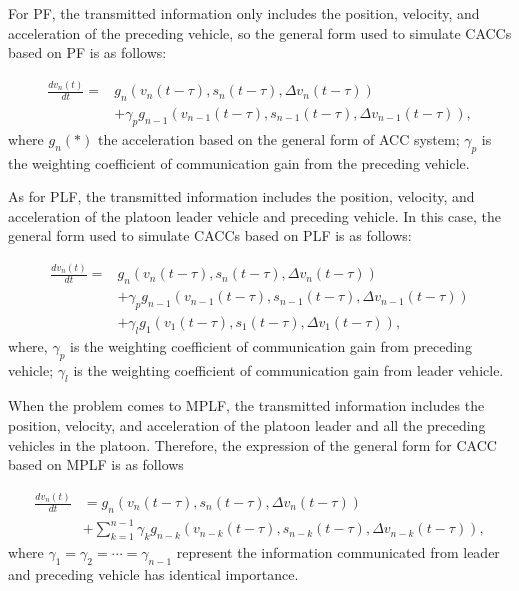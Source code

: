 \documentclass[journal]{IEEEtran}
\begin{document}
For PF, the transmitted information only includes the position, velocity, and acceleration of the preceding vehicle, so the general form used to simulate CACCs based on PF is as follows:

\begin{equation}
\begin{aligned}
\frac{d v_{n}(t)}{d t}=& g_{n}\left(v_{n}(t-\tau), s_{n}(t-\tau), \Delta v_{n}(t-\tau)\right) \\
&+\gamma_{p} g_{n-1}\left(v_{n-1}(t-\tau), s_{n-1}(t-\tau), \Delta v_{n-1}(t-\tau)\right),
\end{aligned}
\label{Eq2}
\end{equation}
where $g_n (*)$ the acceleration based on the general form of ACC system; $\gamma_p$ is the weighting coefficient of communication gain from the preceding vehicle.


As for PLF, the transmitted information includes the position, velocity, and acceleration of the platoon leader vehicle and preceding vehicle. In this case, the general form used to simulate CACCs based on PLF is as follows:

\begin{equation}
\begin{aligned}
\frac{d v_{n}(t)}{d t}=& g_{n}\left(v_{n}(t-\tau), s_{n}(t-\tau), \Delta v_{n}(t-\tau)\right) \\
&+\gamma_{p} g_{n-1}\left(v_{n-1}(t-\tau), s_{n-1}(t-\tau), \Delta v_{n-1}(t-\tau)\right) \\
&+\gamma_{l} g_{1}\left(v_{1}(t-\tau), s_{1}(t-\tau), \Delta v_{1}(t-\tau)\right),
\end{aligned}
\label{Eq3}
\end{equation}
where, $\gamma_p$ is the weighting coefficient of communication gain from preceding vehicle; $\gamma_l$ is the weighting coefficient of communication gain from leader vehicle.

When the problem comes to MPLF, the transmitted information includes the position, velocity, and acceleration of the platoon leader and all the preceding vehicles in the platoon. Therefore, the expression of the general form for CACC based on MPLF is as follows

\begin{equation}
\begin{aligned}
\frac{d v_{n}(t)}{d t}&=g_{n} \left(v_{n}(t-\tau), s_{n}(t-\tau), \Delta v_{n}(t-\tau)\right) \\
&+\sum_{k=1}^{n-1} \gamma_{k} g_{n-k}\left(v_{n-k}(t-\tau), s_{n-k}(t-\tau), \Delta v_{n-k}(t-\tau)\right),
\end{aligned}
\label{Eq4}
\end{equation}
where $\gamma_1=\gamma_2=\cdots	=\gamma_{n-1}$ represent the information communicated from leader and preceding vehicle has identical importance.
\end{document}
